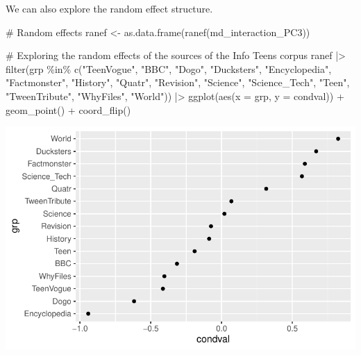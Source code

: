 \documentclass[
  letterpaper,
  DIV=11,
  numbers=noendperiod]{scrreprt}
\newenvironment{Shaded}{\begin{snugshade}}{\end{snugshade}}
\newcommand{\AttributeTok}[1]{\textcolor[rgb]{0.40,0.45,0.13}{#1}}
\newcommand{\CommentTok}[1]{\textcolor[rgb]{0.37,0.37,0.37}{#1}}
\newcommand{\FunctionTok}[1]{\textcolor[rgb]{0.28,0.35,0.67}{#1}}
\newcommand{\NormalTok}[1]{\textcolor[rgb]{0.00,0.23,0.31}{#1}}
\newcommand{\OtherTok}[1]{\textcolor[rgb]{0.00,0.23,0.31}{#1}}
\newcommand{\SpecialCharTok}[1]{\textcolor[rgb]{0.37,0.37,0.37}{#1}}
\newcommand{\StringTok}[1]{\textcolor[rgb]{0.13,0.47,0.30}{#1}}
\begin{document}
We can also explore the random effect structure.

\begin{Shaded}
\begin{Highlighting}[]
\CommentTok{\# Random effects}
\NormalTok{ranef }\OtherTok{\textless{}{-}} \FunctionTok{as.data.frame}\NormalTok{(}\FunctionTok{ranef}\NormalTok{(md\_interaction\_PC3))}

\CommentTok{\# Exploring the random effects of the sources of the Info Teens corpus}
\NormalTok{ranef }\SpecialCharTok{|\textgreater{}} 
  \FunctionTok{filter}\NormalTok{(grp }\SpecialCharTok{\%in\%} \FunctionTok{c}\NormalTok{(}\StringTok{"TeenVogue"}\NormalTok{, }\StringTok{"BBC"}\NormalTok{, }\StringTok{"Dogo"}\NormalTok{, }\StringTok{"Ducksters"}\NormalTok{, }\StringTok{"Encyclopedia"}\NormalTok{, }\StringTok{"Factmonster"}\NormalTok{, }\StringTok{"History"}\NormalTok{, }\StringTok{"Quatr"}\NormalTok{, }\StringTok{"Revision"}\NormalTok{, }\StringTok{"Science"}\NormalTok{, }\StringTok{"Science\_Tech"}\NormalTok{, }\StringTok{"Teen"}\NormalTok{, }\StringTok{"TweenTribute"}\NormalTok{, }\StringTok{"WhyFiles"}\NormalTok{, }\StringTok{"World"}\NormalTok{)) }\SpecialCharTok{|\textgreater{}} 
  \FunctionTok{ggplot}\NormalTok{(}\FunctionTok{aes}\NormalTok{(}\AttributeTok{x =}\NormalTok{ grp, }\AttributeTok{y =}\NormalTok{ condval)) }\SpecialCharTok{+}
  \FunctionTok{geom\_point}\NormalTok{() }\SpecialCharTok{+}
  \FunctionTok{coord\_flip}\NormalTok{()}
\end{Highlighting}
\end{Shaded}

\includegraphics{G_Ch7_Analysis_files/figure-pdf/unnamed-chunk-17-1.pdf}

\begin{Shaded}
\end{Shaded}
\end{document}
